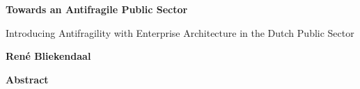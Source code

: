 \thispagestyle{plain}
{}
\begin{center}
	\Large
	\textbf{Towards an Antifragile Public Sector}
	
	\vspace{0.4cm}
	\large
	Introducing Antifragility with Enterprise Architecture in the Dutch Public Sector
	
	\vspace{0.4cm}
	\textbf{René Bliekendaal}
	
	\vspace{0.9cm}
	\textbf{Abstract}
\end{center}

\lipsum[1]